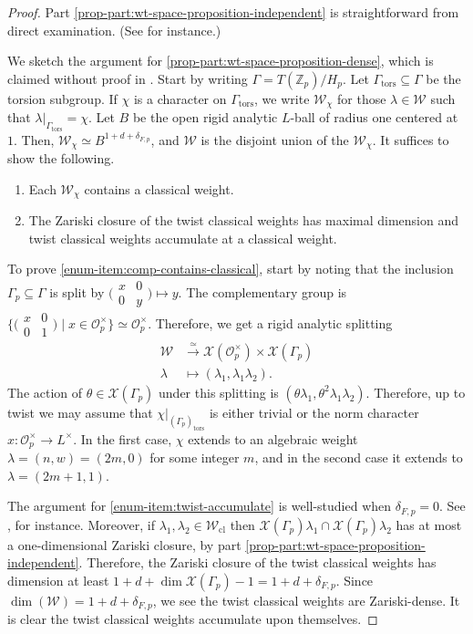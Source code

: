 \documentclass[10pt, twoside]{amsart}
\theoremstyle{plain}
\theoremstyle{definition}
\theoremstyle{remark}
\numberwithin{equation}{subsection}
\def\Z{\mathbb Z}
\def\scro{\mathscr O}
\def\scro{\mathscr O}
\def\scrw{\mathscr W}
\def\scrx{\mathscr X}
\def\cl{\mathrm{cl}}
\def\tors{\mathrm{tors}}
\newcommand{\smallmat}[4]{\bigl(\begin{smallmatrix}#1&#2\\#3&#4\end{smallmatrix}\bigr)}
\begin{document}
\begin{proof}
Part \ref{prop-part:wt-space-proposition-independent} is straightforward from direct examination. (See \cite[Lemma 6.1.3]{BH} for instance.) 

We sketch the argument for \ref{prop-part:wt-space-proposition-dense}, which is claimed without proof in \cite[Lemma 6.1.4]{BH}. Start by writing $\Gamma = T(\Z_p)/H_p$. Let $\Gamma_{\tors}\subseteq \Gamma$ be the torsion subgroup. If $\chi$ is a character on $\Gamma_\tors$, we write $\scrw_\chi$ for those $\lambda \in \scrw$ such that $\lambda|_{\Gamma_\tors} = \chi$. Let $B$ be the open rigid analytic $L$-ball of radius one centered at $1$. Then, $\scrw_{\chi} \simeq B^{1+d+\delta_{F,p}}$, and $\scrw$ is the disjoint union of the $\scrw_\chi$. It suffices to show the following. 
\begin{enumerate}[label=(\alph*)]
\item Each $\scrw_{\chi}$ contains a classical weight.\label{enum-item:comp-contains-classical}
\item The Zariski closure of the twist classical weights has maximal dimension and twist classical weights accumulate at a classical weight.\label{enum-item:twist-accumulate}
\end{enumerate}
To prove \ref{enum-item:comp-contains-classical}, start by noting that the inclusion $\Gamma_p \subseteq \Gamma$ is split by $\smallmat x00y\mapsto y$. The complementary group is $\{\smallmat x001 \mid x \in \scro_p^\times\} \simeq \scro_p^\times$. Therefore, we get a rigid analytic splitting
\begin{align*}
\scrw &\xrightarrow{\simeq} \scrx(\scro_p^\times) \times \scrx(\Gamma_p)\\
\lambda &\longmapsto (\lambda_1,\lambda_1\lambda_2).
\end{align*}
The action of $\theta \in \scrx(\Gamma_p)$ under this splitting is $(\theta\lambda_1,\theta^2\lambda_1\lambda_2)$. Therefore, up to twist we may assume that $\chi|_{(\Gamma_p)_{\tors}}$ is either trivial or the norm character $x: \scro_p^\times \rightarrow L^\times$. In the first case, $\chi$ extends to an algebraic weight $\lambda=(n,w)=(2m,0)$ for some integer $m$, and in the second case it extends to $\lambda=(2m+1,1)$. 

The argument for \ref{enum-item:twist-accumulate} is  well-studied when $\delta_{F,p} = 0$. See \cite[Proposition 5.1.4]{Birk}, for instance. Moreover, if $\lambda_1,\lambda_2 \in \scrw_{\cl}$ then $\scrx(\Gamma_p)\lambda_1 \cap \scrx(\Gamma_p)\lambda_2$ has at most a one-dimensional Zariski closure, by part \ref{prop-part:wt-space-proposition-independent}. Therefore, the Zariski closure of the twist classical weights has dimension at least $1+d+\dim \scrx(\Gamma_p) - 1 = 1 + d + \delta_{F,p}$. Since $\dim(\scrw) = 1 + d + \delta_{F,p}$, we see the twist classical weights are Zariski-dense. It is clear the twist classical weights accumulate upon themselves.
\end{proof}
\end{document}
